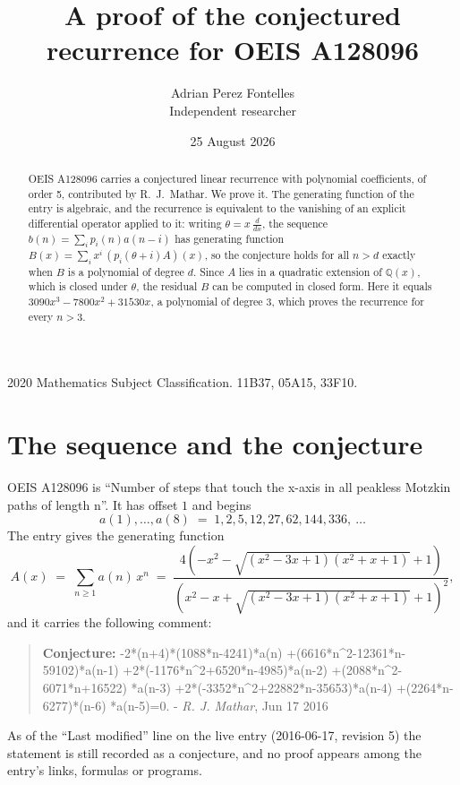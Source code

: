 \documentclass[11pt,a4paper]{article}
\title{A proof of the conjectured recurrence for OEIS A128096}
\author{Adrian Perez Fontelles\\ \small Independent researcher}
\date{25 August 2026}
\theoremstyle{plain}
\theoremstyle{definition}
\begin{document}
\maketitle

\begin{abstract}
OEIS A128096 carries a conjectured linear recurrence with polynomial coefficients, of
order 5, contributed by R.~J.~Mathar. We prove it. The generating function of the
entry is algebraic, and the recurrence is equivalent to the vanishing of an explicit
differential operator applied to it: writing $\theta=x\,\frac{d}{dx}$, the sequence
$b(n)=\sum_{i}p_{i}(n)a(n-i)$ has generating function
$B(x)=\sum_{i}x^{i}\,(p_{i}(\theta+i)A)(x)$, so the conjecture holds for all $n>d$ exactly
when $B$ is a polynomial of degree $d$. Since $A$ lies in a quadratic extension of
$\mathbb{Q}(x)$, which is closed under $\theta$, the residual $B$ can be computed in
closed form. Here it equals $3090 x^{3} - 7800 x^{2} + 31530 x$, a polynomial of degree $3$, which proves
the recurrence for every $n>3$.
\end{abstract}

\noindent\small 2020 Mathematics Subject Classification. 11B37, 05A15, 33F10.\normalsize

\section{The sequence and the conjecture}

OEIS A128096 is ``Number of steps that touch the x-axis in all peakless Motzkin paths of length n''. It has offset $1$ and begins
\[
a(1),\dots,a(8)\;=\;1, 2, 5, 12, 27, 62, 144, 336,\ \dots
\]
The entry gives the generating function
\begin{equation}\label{eq:gf}
A(x)\;=\;\sum_{n\ge 1} a(n)\,x^{n}\;=\;\frac{4 \left(- x^{2} - \sqrt{\left(x^{2} - 3 x + 1\right) \left(x^{2} + x + 1\right)} + 1\right)}{\left(x^{2} - x + \sqrt{\left(x^{2} - 3 x + 1\right) \left(x^{2} + x + 1\right)} + 1\right)^{2}} ,
\end{equation}
and it carries the following comment:
\begin{quote}\small
\textbf{Conjecture:} -2*(n+4)*(1088*n-4241)*a(n) +(6616*n\^{}2-12361*n-59102)*a(n-1) +2*(-1176*n\^{}2+6520*n-4985)*a(n-2) +(2088*n\^{}2-6071*n+16522) *a(n-3) +2*(-3352*n\^{}2+22882*n-35653)*a(n-4) +(2264*n-6277)*(n-6) *a(n-5)=0. - \emph{R. J. Mathar}, Jun 17 2016
\end{quote}
As of the ``Last modified'' line on the live entry (2016-06-17, revision 5) the
statement is still recorded as a conjecture, and no proof appears among the entry's links,
formulas or programs.
\end{document}

